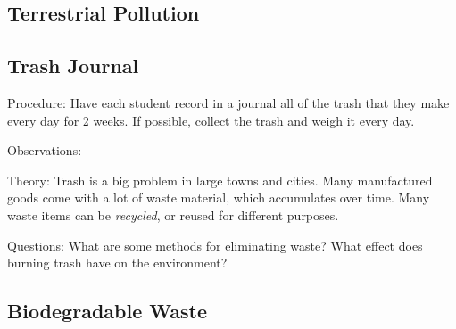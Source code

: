 \begin{multicols}{2}
\section*{Terrestrial Pollution}


\subsection{Trash Journal} %


\begin{description*}
\item[Procedure:]{Have each student record in a journal all of the trash that they make every day for 2 weeks. If possible, collect the trash and weigh it every day.}
\item[Observations:]{}
\item[Theory:]{Trash is a big problem in large towns and cities. Many manufactured goods come with a lot of waste material, which accumulates over time. Many waste items can be \emph{recycled}, or reused for different purposes.}
\item[Questions:]{What are some methods for eliminating waste? What effect does burning trash have on the environment?}
\end{description*}

\subsection{Biodegradable Waste} %



\end{multicols}
